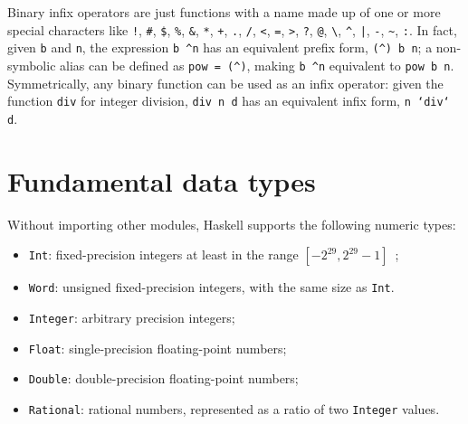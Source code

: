 \documentclass[UdineBachThesis,american,11pt]{PhdThesis}
\begin{document}
  Binary infix operators are just functions with a name made up of one or more
  special characters like \texttt{!}, \texttt{\#}, \texttt{\$}, \texttt{\%},
  \texttt{\&}, \texttt{*}, \texttt{+}, \texttt{.}, \texttt{/}, \texttt{<},
  \texttt{=}, \texttt{>}, \texttt{?}, \texttt{@}, \texttt{\textbackslash},
  \texttt{\textasciicircum}, \texttt{|}, \texttt{-}, \texttt{\textasciitilde},
  \texttt{:}. In fact, given \texttt{b} and \texttt{n}, the expression
  \mbox{\texttt{b \textasciicircum n}} has an equivalent prefix form,
  \mbox{\texttt{(\textasciicircum) b n}}; a non-symbolic alias can be defined as
  \mbox{\texttt{pow = (\textasciicircum)}}, making
  \mbox{\texttt{b \textasciicircum n}} equivalent to \mbox{\texttt{pow b n}}.
  Symmetrically, any binary function can be used as an infix operator: given the
  function \mbox{\texttt{div}} for integer division, \mbox{\texttt{div n d}} has
  an equivalent infix form, \mbox{\texttt{n `div` d}}.

  \section{Fundamental data types}

  Without importing other modules, Haskell supports the following numeric types:

  \begin{itemize}
    \item \mbox{\texttt{Int}}: fixed-precision integers at least in the range
    \mbox{$\left[-2^{29}, 2^{29} - 1\right]$}~\cite{haskell-signed-integer-types};

    \item \mbox{\texttt{Word}}: unsigned fixed-precision integers, with the same
    size as \mbox{\texttt{Int}}.

    \item \mbox{\texttt{Integer}}: arbitrary precision integers;

    \item \mbox{\texttt{Float}}: single-precision floating-point numbers;

    \item \mbox{\texttt{Double}}: double-precision floating-point numbers;

    \item \mbox{\texttt{Rational}}: rational numbers, represented as a ratio of
    two \mbox{\texttt{Integer}} values.
  \end{itemize}
\end{document}
